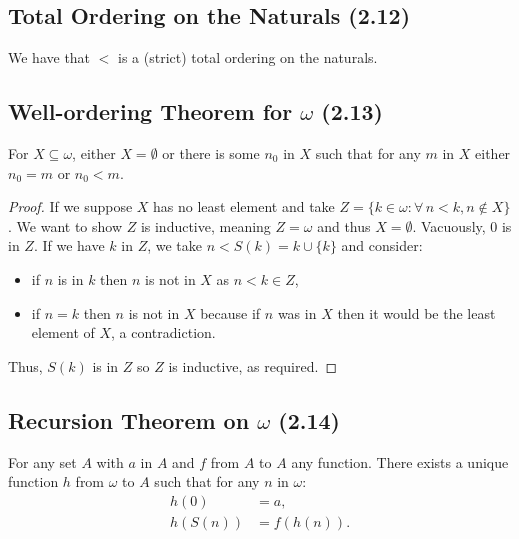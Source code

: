 \subsection{Total Ordering on the Naturals (2.12)} \label{2.12}

We have that $<$ is a (strict) total ordering on the naturals.

\subsection{Well-ordering Theorem for $\omega$ (2.13)} \label{2.13}

For $X \subseteq \omega$, either $X = \emptyset$ or there is some
$n_0$ in $X$ such that for any $m$ in $X$ either $n_0 = m$ or $n_0 < m$.

\begin{proof}
    If we suppose $X$ has no least element and take 
    $Z = \{k \in \omega : \forall \, n < k, n \notin X\}$.
    We want to show $Z$ is inductive, meaning $Z = \omega$ and thus $X = \emptyset$. 
    Vacuously, $0$ is in $Z$. If we have $k$ in $Z$, we take $n < S(k) = k \cup \{k\}$ 
    and consider: \begin{itemize}
        \item if $n$ is in $k$ then $n$ is not in $X$ as $n < k \in Z$,
        \item if $n = k$ then $n$ is not in $X$ because if $n$ was in $X$
            then it would be the least element of $X$, a contradiction.
    \end{itemize} Thus, $S(k)$ is in $Z$ so $Z$ is inductive, as required.
\end{proof}

\subsection{Recursion Theorem on $\omega$ (2.14)} \label{2.14} 

For any set $A$ with $a$ in $A$ and $f$ from $A$ to $A$ any function.
There exists a unique function $h$ from $\omega$ to $A$ such that for any $n$ in $\omega$:
\begin{align*}
    h(0) &= a, \\
    h(S(n)) &= f(h(n)).
\end{align*}

